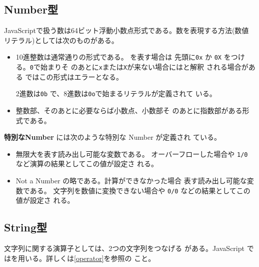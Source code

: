 \subsection{Number型}
JavaScriptで扱う数は64ビット浮動小数点形式である。数を表現する方法(数値
リテラル)としては次のものがある。
\begin{itemize}
 \item{\bfseries {}} 10進整数は通常通りの形式である。
      を表す場合は
	      先頭に\Verb+0x+ か \Verb+0X+ をつける。\Verb+0+で始まりそ
	      のあとに\Verb+x+または\Verb+X+が来ない場合にはと解釈
      される場合がある
      \Strict ではこの形式はエラーとなる。

      2進数は\Verb+0b+ で、8進数は\Verb+0o+で始まるリテラルが定義されて
      いる。
 \item{\bfseries {}} 整数部、そのあとに必要ならば小数点、小数部そ
       のあとに指数部がある形式である。
\end{itemize}
{\bfseries 特別なNumber} には次のような特別な Number が定義され
ている。
\begin{itemize}
 \item {\bfseries {}}無限大を表す読み出し可能な変数である。
       オーバーフローした場合や \Verb+1/0+ など演算の結果としてこの値が設定さ
       れる。
 \item {\bfseries {}} Not a Number の略である。計算ができなかった場合
       表す読み出し可能な変数である。
       文字列を数値に変換できない場合や \Verb+0/0+ などの結果としてこの値が設定さ
       れる。
\end{itemize}
\subsection{String型}
文字列に関する演算子としては、2つの文字列をつなげる
がある。JavaScript では\ElmJ{+}を用いる。詳しくは\ref{operator}を参照の
こと。

